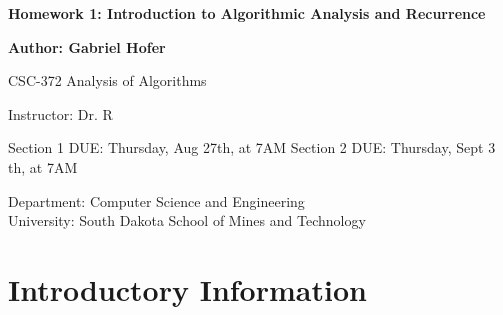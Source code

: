 \documentclass[12pt]{article}
\begin{document}
\begin{titlepage}
   \begin{center}
       \vspace*{1cm}
       \large
       \textbf{Homework 1: Introduction to Algorithmic Analysis and Recurrence}
       \normalsize

       \vspace{0.5cm}

       \textbf{Author: Gabriel Hofer}

       \vspace{0.5cm}

       CSC-372 Analysis of Algorithms

       \vspace{0.5cm}

       Instructor: Dr. R

       \vspace{0.5cm}

       Section 1 DUE: Thursday, Aug 27th, at 7AM  \newline
       Section 2 DUE: Thursday, Sept 3 th, at 7AM  

       \vfill

       Department: Computer Science and Engineering\\
       University: South Dakota School of Mines and Technology\\

   \end{center}
\end{titlepage}
\newpage
\section{Introductory Information}
\end{document}
